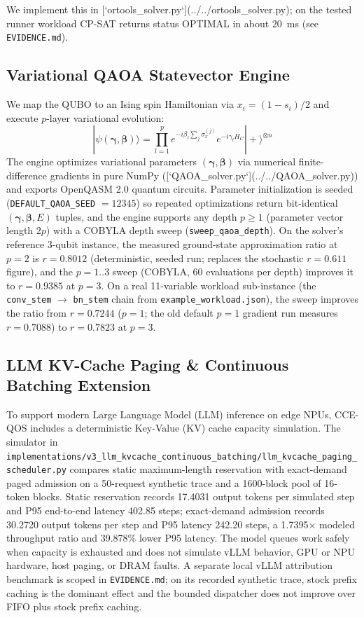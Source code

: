 \documentclass[journal]{IEEEtran}
\theoremstyle{definition}
\begin{document}
We implement this in [`ortools_solver.py`](../../ortools_solver.py); on the tested runner workload CP-SAT returns status OPTIMAL in about $20$~ms (see \texttt{EVIDENCE.md}).

\subsection{Variational QAOA Statevector Engine}
We map the QUBO to an Ising spin Hamiltonian via $x_i = (1 - s_i)/2$ and execute $p$-layer variational evolution:
\begin{equation}
|\psi(\boldsymbol{\gamma}, \boldsymbol{\beta})\rangle = \prod_{l=1}^p e^{-i \beta_l \sum_j \sigma_x^{(j)}} e^{-i \gamma_l H_C} |+\rangle^{\otimes n}
\end{equation}
The engine optimizes variational parameters $(\boldsymbol{\gamma}, \boldsymbol{\beta})$ via numerical finite-difference gradients in pure NumPy ([`QAOA_solver.py`](../../QAOA_solver.py)) and exports OpenQASM 2.0 quantum circuits. Parameter initialization is seeded (\texttt{DEFAULT\_QAOA\_SEED} $= 12345$) so repeated optimizations return bit-identical $(\boldsymbol{\gamma}, \boldsymbol{\beta}, E)$ tuples, and the engine supports any depth $p \ge 1$ (parameter vector length $2p$) with a COBYLA depth sweep (\texttt{sweep\_qaoa\_depth}). On the solver's reference 3-qubit instance, the measured ground-state approximation ratio at $p=2$ is $r = 0.8012$ (deterministic, seeded run; replaces the stochastic $r = 0.611$ figure), and the $p = 1..3$ sweep (COBYLA, 60 evaluations per depth) improves it to $r = 0.9385$ at $p=3$. On a real 11-variable workload sub-instance (the \texttt{conv\_stem} $\to$ \texttt{bn\_stem} chain from \texttt{example\_workload.json}), the sweep improves the ratio from $r = 0.7244$ ($p=1$; the old default $p=1$ gradient run measures $r = 0.7088$) to $r = 0.7823$ at $p=3$.

\subsection{LLM KV-Cache Paging \& Continuous Batching Extension}
To support modern Large Language Model (LLM) inference on edge NPUs, CCE-QOS includes a deterministic Key-Value (KV) cache capacity simulation. The simulator in \texttt{implementations/v3\_llm\_kvcache\_continuous\_batching/llm\_kvcache\_paging\_scheduler.py} compares static maximum-length reservation with exact-demand paged admission on a 50-request synthetic trace and a 1600-block pool of 16-token blocks. Static reservation records 17.4031 output tokens per simulated step and P95 end-to-end latency 402.85 steps; exact-demand admission records 30.2720 output tokens per step and P95 latency 242.20 steps, a 1.7395$\times$ modeled throughput ratio and 39.878\% lower P95 latency. The model queues work safely when capacity is exhausted and does not simulate vLLM behavior, GPU or NPU hardware, host paging, or DRAM faults. A separate local vLLM attribution benchmark is scoped in \texttt{EVIDENCE.md}; on its recorded synthetic trace, stock prefix caching is the dominant effect and the bounded dispatcher does not improve over FIFO plus stock prefix caching.
\end{document}
